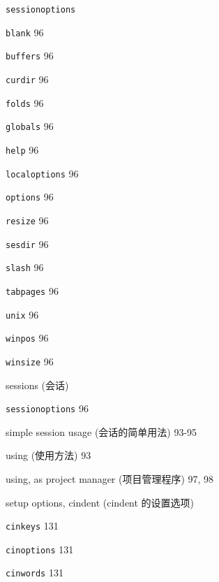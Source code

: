 \begin{multicols}{2}
\hangindent=3pc  \texttt{sessionoptions} \par
\hangindent=3pc \quad \texttt{blank} 96 \par
\hangindent=3pc \quad \texttt{buffers} 96 \par
\hangindent=3pc \quad \texttt{curdir} 96 \par
\hangindent=3pc \quad \texttt{folds} 96 \par
\hangindent=3pc \quad \texttt{globals} 96 \par
\hangindent=3pc \quad \texttt{help} 96 \par
\hangindent=3pc \quad \texttt{localoptions} 96 \par
\hangindent=3pc \quad \texttt{options} 96 \par
\hangindent=3pc \quad \texttt{resize} 96 \par
\hangindent=3pc \quad \texttt{sesdir} 96 \par
\hangindent=3pc \quad \texttt{slash} 96 \par
\hangindent=3pc \quad \texttt{tabpages} 96 \par
\hangindent=3pc \quad \texttt{unix} 96 \par
\hangindent=3pc \quad \texttt{winpos} 96 \par
\hangindent=3pc \quad \texttt{winsize} 96 \par

\hangindent=3pc  sessions (会话) \par
\hangindent=3pc \quad \texttt{sessionoptions} 96 \par
\hangindent=3pc \quad simple session usage (会话的简单用法) 93-95 \par
\hangindent=3pc \quad using (使用方法) 93 \par
\hangindent=3pc \quad using, as project manager (项目管理程序) 97, 98 \par

\hangindent=3pc  setup options, cindent (cindent 的设置选项) \par
\hangindent=3pc \quad \texttt{cinkeys} 131 \par
\hangindent=3pc \quad \texttt{cinoptions} 131 \par
\hangindent=3pc \quad \texttt{cinwords} 131 \par


\end{multicols}
